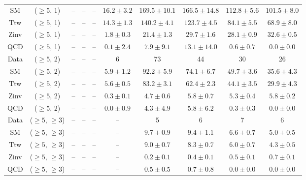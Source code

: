\begin{table}[h!]
{\begin{tabular}{cccccccccc}
	SM & ($\ge5$, 1) & -- & -- & -- & $16.2\pm 3.2$ & $169.5\pm 10.1$ & $166.5\pm 14.8$ & $112.8\pm 5.6$ & $101.5\pm 8.0$ \\[0.5ex] 
	Ttw & ($\ge5$, 1) & -- & -- & -- & $14.3\pm 1.3$ & $140.2\pm 4.1$ & $123.7\pm 4.5$ & $84.1\pm 5.5$ & $68.9\pm 8.0$ \\[0.5ex] 
	Zinv & ($\ge5$, 1) & -- & -- & -- & $1.8\pm 0.3$ & $21.4\pm 1.3$ & $29.7\pm 1.6$ & $28.1\pm 0.9$ & $32.6\pm 0.5$ \\[0.5ex] 
	QCD & ($\ge5$, 1) & -- & -- & -- & $0.1\pm 2.4$ & $7.9\pm 9.1$ & $13.1\pm 14.0$ & $0.6\pm 0.7$ & $0.0\pm 0.0$ \\[0.5ex] 
	Data & ($\ge5$, 2) & -- & -- & -- & 6 & 73 & 44 & 30 & 26 \\[0.5ex] 
	SM & ($\ge5$, 2) & -- & -- & -- & $5.9\pm 1.2$ & $92.2\pm 5.9$ & $74.1\pm 6.7$ & $49.7\pm 3.6$ & $35.6\pm 4.3$ \\[0.5ex] 
	Ttw & ($\ge5$, 2) & -- & -- & -- & $5.6\pm 0.5$ & $83.2\pm 3.1$ & $62.4\pm 2.3$ & $44.1\pm 3.5$ & $29.9\pm 4.3$ \\[0.5ex] 
	Zinv & ($\ge5$, 2) & -- & -- & -- & $0.3\pm 0.1$ & $4.7\pm 0.6$ & $5.8\pm 0.7$ & $5.3\pm 0.4$ & $5.8\pm 0.2$ \\[0.5ex] 
	QCD & ($\ge5$, 2) & -- & -- & -- & $0.0\pm 0.9$ & $4.3\pm 4.9$ & $5.8\pm 6.2$ & $0.3\pm 0.3$ & $0.0\pm 0.0$ \\[0.5ex] 
	Data & ($\ge5$, $\ge3$) & -- & -- & -- & -- & 5 & 6 & 7 & 6 \\[0.5ex] 
	SM & ($\ge5$, $\ge3$) & -- & -- & -- & -- & $9.7\pm 0.9$ & $9.4\pm 1.1$ & $6.6\pm 0.7$ & $5.0\pm 0.5$ \\[0.5ex] 
	Ttw & ($\ge5$, $\ge3$) & -- & -- & -- & -- & $9.0\pm 0.7$ & $8.3\pm 0.7$ & $6.0\pm 0.7$ & $4.3\pm 0.5$ \\[0.5ex] 
	Zinv & ($\ge5$, $\ge3$) & -- & -- & -- & -- & $0.2\pm 0.1$ & $0.4\pm 0.1$ & $0.5\pm 0.1$ & $0.7\pm 0.1$ \\[0.5ex] 
	QCD & ($\ge5$, $\ge3$) & -- & -- & -- & -- & $0.5\pm 0.5$ & $0.7\pm 0.8$ & $0.0\pm 0.0$ & $0.0\pm 0.0$ \\[0.5ex] 
	\hline
	\hline
\end{tabular}}
\end{table}
